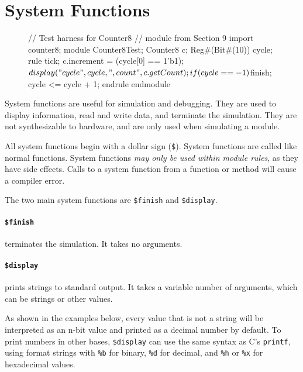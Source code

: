 \section{System Functions}
\label{sec:systemFunctions}

\begin{wrapfigure}{r}{0.32\columnwidth}
\vspace{-3em}
\begin{mscode}
// Test harness for Counter8
// module from Section 9
import counter8;
module Counter8Test;
  Counter8 c;
  Reg#(Bit#(10)) cycle;
  rule tick;
    c.increment =
     (cycle[0] == 1'b1);
    $display("cycle ", cycle,
     ", count ", c.getCount);
    if (cycle == -1) $finish;
    cycle <= cycle + 1;
  endrule
endmodule
\end{mscode}
\vspace{-4em}
\end{wrapfigure}

System functions are useful for simulation and debugging. 
They are used to display information, read and write data,
and terminate the simulation.
They are not synthesizable to hardware,
and are only used when simulating a module.

All system functions begin with a dollar sign (\verb|$|).
System functions are called like normal functions.
System functions \emph{may only be used within module rules}, as they have side effects.
Calls to a system function from a function or method will cause a compiler error.

The two main system functions are \verb|$finish| and \verb|$display|.

\paragraph{\texttt{\$finish}} terminates the simulation. It takes no arguments.

\paragraph{\texttt{\$display}} prints strings to standard output.
It takes a variable number of arguments, which can be strings or other values.

As shown in the examples below, every value that is not a string will be interpreted as an n-bit value and printed as a decimal number by default.
To print numbers in other bases, \verb|$display| can use the same syntax as C's \verb|printf|,
using format strings with \verb|%b| for binary, \verb|%d| for decimal, and \verb|%h| or \verb|%x| for hexadecimal values.

